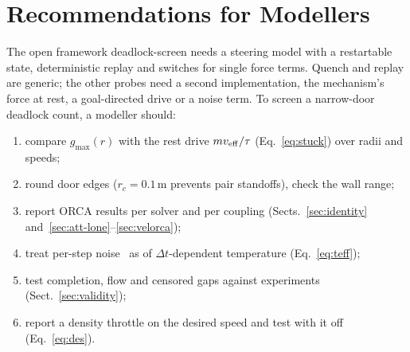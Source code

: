 \section{Recommendations for Modellers}\label{sec:recommend}
The open framework deadlock-screen needs a steering model with a restartable state, deterministic replay and switches for single force terms. Quench and replay are generic; the other probes need a second implementation, the mechanism's force at rest, a goal-directed drive or a noise term. To screen a narrow-door deadlock count, a modeller should:
\begin{enumerate}
\renewcommand{\labelenumi}{(\roman{enumi})}
\item compare $g_{\max}(r)$ with the rest drive $m v_{\rm eff}/\tau$ (Eq.~\eqref{eq:stuck}) over radii and speeds;
\item round door edges ($r_c=0.1$\,m prevents pair standoffs), check the wall range;
\item report ORCA results per solver and per coupling (Sects.~\ref{sec:identity} and~\ref{sec:att-lone}--\ref{sec:velorca});
\item treat per-step noise~\cite{xu2021} as of $\Delta t$-dependent temperature (Eq.~\eqref{eq:teff});
\item test completion, flow and censored gaps against experiments (Sect.~\ref{sec:validity});
\item report a density throttle on the desired speed and test with it off (Eq.~\eqref{eq:des}).
\end{enumerate}
